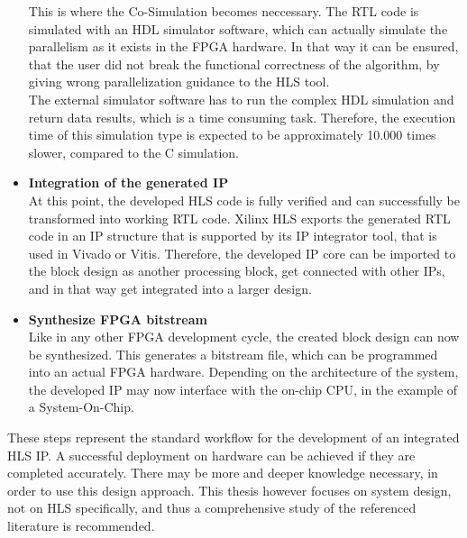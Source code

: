 \begin{itemize}
      This is where the Co-Simulation becomes neccessary.
      The RTL code is simulated with an HDL simulator software, which can actually simulate the parallelism as it exists in the FPGA hardware.
      In that way it can be ensured, that the user did not break the functional correctness of the algorithm, by giving wrong parallelization guidance to the HLS tool.\\

      The external simulator software has to run the complex HDL simulation and return data results, which is a time consuming task.
      Therefore, the execution time of this simulation type is expected to be approximately 10.000 times slower, compared to the C simulation.\\

  \item \textbf{Integration of the generated IP}\\
      At this point, the developed HLS code is fully verified and can successfully be transformed into working RTL code.
      Xilinx HLS exports the generated RTL code in an IP structure that is supported by its IP integrator tool, that is used in Vivado or Vitis.
      Therefore, the developed IP core can be imported to the block design as another processing block, get connected with other IPs, and in that way get integrated into a larger design.\\

  \item \textbf{Synthesize FPGA bitstream}\\
      Like in any other FPGA development cycle, the created block design can now be synthesized.
      This generates a bitstream file, which can be programmed into an actual FPGA hardware.
      Depending on the architecture of the system, the developed IP may now interface with the on-chip CPU, in the example of a System-On-Chip.\\
\end{itemize}

These steps represent the standard workflow for the development of an integrated HLS IP.
A successful deployment on hardware can be achieved if they are completed accurately.
There may be more and deeper knowledge necessary, in order to use this design approach.
This thesis however focuses on system design, not on HLS specifically, and thus a comprehensive study of the referenced literature is recommended.

